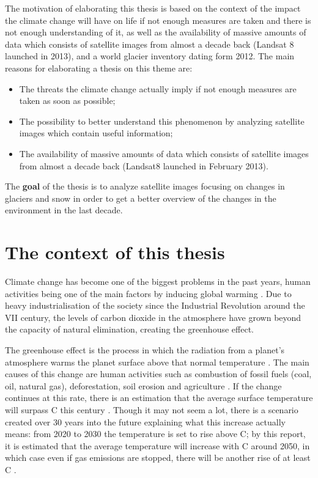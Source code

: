 \documentclass[12pt, a4paper]{report}
\begin{document}
	The motivation of elaborating this thesis is based on the context of the impact the climate change will have on life if not enough measures are taken and there is not enough understanding of it, as well as the availability of massive amounts of data which consists of satellite images from almost a decade back (Landsat 8 launched in 2013), and a world glacier inventory dating form 2012.
	The main reasons for elaborating a thesis on this theme are:
	\begin{itemize}
		\item The threats the climate change actually imply if not enough measures are taken as soon as possible;
		\item The possibility to better understand this phenomenon by analyzing satellite images which contain useful information;
		\item The availability of massive amounts of data which consists of satellite images from almost a decade back (Landsat8 launched in February 2013).
	\end{itemize}

	The \textbf{goal} of the thesis is to analyze satellite images focusing on changes in glaciers and snow in order to get a better overview of the changes in the environment in the last decade. 
	
	
	\section{The context of this thesis} 
	
	 Climate change has become one of the biggest problems in the past years, human activities being one of the main factors by inducing global warming \cite{climate_change_1}. Due to heavy industrialisation of the society since the Industrial Revolution around the VII century, the levels of carbon dioxide in the atmosphere have grown beyond the capacity of natural elimination, creating the greenhouse effect. 
	
	The greenhouse effect is the process in which the radiation from a planet's atmosphere warms the planet surface above that normal temperature \cite{greenhouse}. The main causes of this change are human activities such as combustion of fossil fuels (coal, oil, natural gas), deforestation, soil erosion and agriculture \cite{climate_change_2}. If the change continues at this rate, there is an estimation that the average surface temperature will surpass   C this century \cite{climate_change_3}. Though it may not seem a lot, there is a scenario created over 30 years into the future explaining what this increase actually means: from 2020 to 2030 the temperature is set to rise above C; by this report, it is estimated that the average temperature will increase with C around 2050, in which case even if gas emissions are stopped, there will be another rise of at least C \cite{climate_change_4}. 
	
\end{document}
